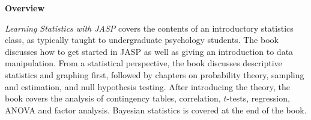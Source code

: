 

\clearpage
\newpage
\begin{center}
{\bf Overview}
\end{center}

\noindent
{\it Learning Statistics with JASP} covers the contents of an introductory statistics class, as typically taught to undergraduate psychology students. The book discusses how to get started in JASP as well as giving an introduction to data manipulation. From a statistical perspective, the book discusses descriptive statistics and graphing first, followed by chapters on probability theory, sampling and estimation, and null hypothesis testing. After introducing the theory, the book covers the analysis of contingency tables, correlation, $t$-tests, regression, ANOVA and factor analysis. Bayesian statistics is covered at the end of the book. 